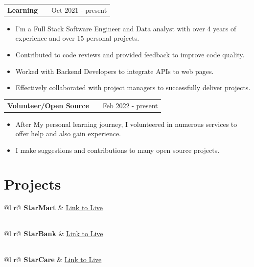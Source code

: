 \documentclass[a4paper,12pt]{article}
\makeatletter
\newenvironment{joblong}[2]
    {
    \begin{tabularx}{\linewidth}{@{}l X r@{}}
    \textbf{#1} & \hfill &  #2 \\[3.75pt]
    \end{tabularx}
    \begin{minipage}[t]{\linewidth}
    \begin{itemize}[nosep,after=\strut, leftmargin=1em, itemsep=3pt,label=--]
    }
    {
    \end{itemize}
    \end{minipage}    
    }
\makeatother
\begin{document}
\begin{joblong}{Learning}{Oct 2021 - present}
\item I'm a Full Stack Software Engineer and Data analyst with over 4 years of experience and over 15 personal projects. 
\item Contributed to code reviews and provided feedback to improve code quality.
\item Worked with Backend Developers to integrate APIs to web pages.
\item Effectively collaborated with project managers to successfully deliver projects.
\end{joblong}

\begin{joblong}{Volunteer/Open Source}{Feb 2022 - present}
\item After My personal learning journey, I volunteered in numerous services to offer help and also gain experience.
\item I make suggestions and contributions to many open source projects. 
\end{joblong}

\section{Projects}

\begin{tabularx}{\linewidth}{ @{}l r@{} }
\textbf{StarMart} & \hfill \href{https://harbystardev.github.io/StarMart/}{Link to Live} \\[3.75pt]
  \\
\end{tabularx}

\begin{tabularx}{\linewidth}{ @{}l r@{} }
\textbf{StarBank} & \hfill \href{https://harbystardev.github.io/StarBank/}{Link to Live} \\[3.75pt]
  \\
\end{tabularx}

\begin{tabularx}{\linewidth}{ @{}l r@{} }
\textbf{StarCare} & \hfill \href{https://harbystardev.github.io/StarCare/}{Link to Live} \\[3.75pt]
  \\
\end{tabularx}
\end{document}
